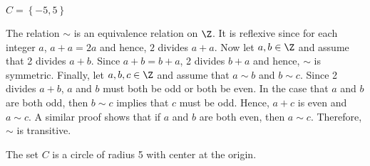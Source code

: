 \begin{list}{}
\item \begin{list}{\bf{(b)}}
\item $C = \left \{ -5, 5 \right \}$
\end{list}
\end{list}


\begin{list}{\bf{\ref{exer:oneequivonenot}.}}
\item \begin{list}{\bf{(a)}} 
\item The relation $\sim$ is an equivalence relation on $\Z$.  It is reflexive since for each integer $a$, $a + a = 2a$ and hence, $2$ divides $a + a$.  Now let $a, b \in \Z$ and assume that 2 divides $a + b$.  Since $a + b = b + a$, 2 divides $b + a$ and hence, $\sim$ is symmetric.  Finally, let $a, b, c \in \Z$ and assume that 
$a \sim b$ and $b \sim c$.  Since 2 divides $a + b$, $a$ and $b$ must both be odd or both be even.  In the case that $a$ and $b$ are both odd, then $b \sim c$ implies that $c$ must be odd.  Hence, $a + c$ is even and $a \sim c$.  A similar proof shows that if $a$ and $b$ are both even, then $a \sim c$.  Therefore, $\sim$ is transitive.
\end{list}
\end{list}


\begin{list}{\bf{\ref{exer:sec72-circles}.}}
\item \begin{list}{\bf{(c)}}
\item The set $C$ is a circle of radius 5 with center at the origin.
\end{list}
\end{list}
\hbreak
\endinput


